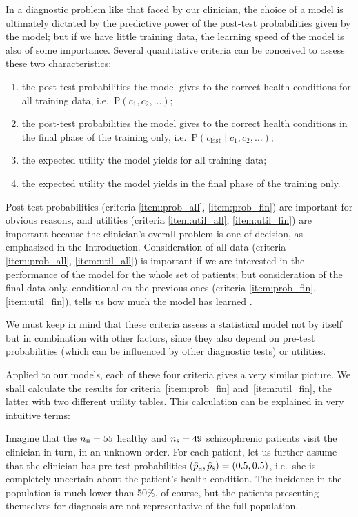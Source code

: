 \documentclass[%
]{frontiersSCNS-nologo} %
\newcommand*{\ie}{i.e.}
\newcommand*{\p}{\mathrm{P}}%
\renewcommand*{\|}{\mathpunct{|}}%
\newcommand*{\yh}{c}
\newcommand*{\yhu}{\textsc{h}}
\newcommand*{\yhd}{\textsc{s}}
\newcommand*{\ypph}{\Hat{p}_{\yhu}}
\newcommand*{\ypps}{\Hat{p}_{\yhd}}
\newcommand*{\yn}{n}
\newcommand*{\ynh}{\yn_{\yhu}}
\newcommand*{\yns}{\yn_{\yhd}}
\begin{document}
In a diagnostic problem like that faced by our clinician, the choice of a
model is ultimately dictated by the predictive power of the post-test
probabilities given by the model; but if we have little training data, the
learning speed of the model is also of some importance. Several
quantitative criteria can be conceived to assess these two characteristics:
\begin{enumerate}
\item\label{item:prob_all}the post-test probabilities the model gives to
  the correct health conditions for all training data, \ie\
  $\p(\yh_1,\yh_2,\dotsc)$;
\item\label{item:prob_fin}the post-test probabilities the model gives to
  the correct health conditions in the final phase of the training only,
  \ie\ $\p(\yh_{\text{last}} \| \yh_1,\yh_2,\dotsc)$;
\item\label{item:util_all}the expected utility the model yields for all
  training data;
\item\label{item:util_fin}the expected utility the model yields in the
  final phase of the training only.
\end{enumerate}
Post-test probabilities (criteria \ref{item:prob_all}, \ref{item:prob_fin})
are important for obvious reasons, and utilities (criteria \ref{item:util_all},
\ref{item:util_fin}) are important because the clinician's overall problem
is one of decision, as emphasized in the Introduction.
Consideration of all data (criteria \ref{item:prob_all},
\ref{item:util_all}) is important if we are interested in the performance
of the model for the whole set of patients; but consideration of the final
data only, conditional on the previous ones (criteria \ref{item:prob_fin},
\ref{item:util_fin}), tells us how much the model has learned
\citep[compare with a similar remark in model comparison using Bayes factors
by][]{bergeretal1996}.

We must keep in mind that these criteria assess a statistical model not by
itself but in combination with other factors, since they also depend on
pre-test probabilities (which can be influenced by other diagnostic tests)
or utilities.

Applied to our models, each of these four criteria gives a very similar
picture. We shall calculate the results for criteria~\ref{item:prob_fin}
and~\ref{item:util_fin}, the latter with two different utility tables.
This calculation can be explained in very intuitive terms:

Imagine that the $\ynh=55$ healthy and $\yns=49$ schizophrenic patients
visit the clinician in turn, in an unknown order. For each patient, let us 
further assume that the
clinician has pre-test probabilities $(\ypph,\ypps)=(0.5, 0.5)$, \ie\ she
is completely uncertain about the patient's health condition. The incidence
in the population is much lower than 50\%, of course, but the patients
presenting themselves for diagnosis are not representative of the full
population.
\end{document}
